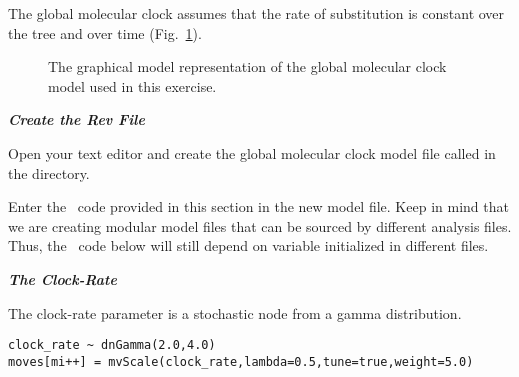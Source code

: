 The global molecular clock assumes that the rate of substitution is constant over the tree and over time (Fig.~\ref{m_GMC:fig}).

\begin{figure}[h!]
\centering
{}
\caption{\small The graphical model representation of the global molecular clock model used in this exercise.}
\label{m_GMC:fig}
\end{figure}

\textbf{\textit{Create the Rev File}}

{\begin{framed}
Open your text editor and create the global molecular clock model file called {\textcolor{red}{}} in the  directory.

Enter the \Rev~code provided in this section in the new model file. Keep in mind that we are creating modular model files that can be sourced by different analysis files. Thus, the \Rev~code below will still depend on variable initialized in different files.
\end{framed}}




\textbf{\textit{The Clock-Rate}}


The clock-rate parameter is a stochastic node from a gamma distribution.
{\tt \begin{snugshade*}
\begin{lstlisting}
clock_rate ~ dnGamma(2.0,4.0)
moves[mi++] = mvScale(clock_rate,lambda=0.5,tune=true,weight=5.0)
\end{lstlisting}
\end{snugshade*}}


